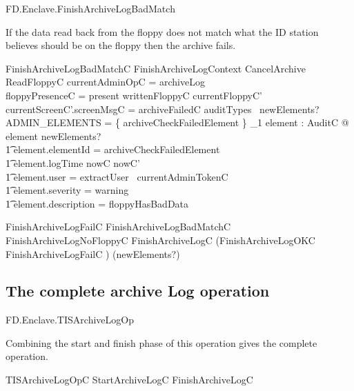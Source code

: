 \begin{traceunit}{FD.Enclave.FinishArchiveLogBadMatch}
\end{traceunit}

If the data read back from the floppy does not match what the ID
station believes should be on the floppy then the archive fails.

\begin{schema}{FinishArchiveLogBadMatchC}
        FinishArchiveLogContext
\also
        CancelArchive
\\      ReadFloppyC
\where
        \The currentAdminOpC = archiveLog
\\      floppyPresenceC = present
\also
        writtenFloppyC \neq currentFloppyC'
\also
        currentScreenC'.screenMsgC = archiveFailedC
\also
        auditTypes~ newElements? \cap ADMIN\_ELEMENTS = 
        \{ archiveCheckFailedElement \} 
\also
        \exists_1 element : AuditC @ element \in newElements? 
\\ \t1  \land element.elementId = archiveCheckFailedElement
\\ \t1  \land element.logTime \in nowC \upto nowC'
\\ \t1  \land element.user = extractUser~ currentAdminTokenC
\\ \t1  \land element.severity = warning
\\ \t1  \land element.description = floppyHasBadData
\end{schema}

\begin{zed}
        FinishArchiveLogFailC  FinishArchiveLogBadMatchC \lor
        FinishArchiveLogNoFloppyC
\also
        FinishArchiveLogC  (FinishArchiveLogOKC \lor FinishArchiveLogFailC
         ) \hide (newElements?)
\end{zed}

\subsection{The complete archive Log operation}

\begin{traceunit}{FD.Enclave.TISArchiveLogOp}
\end{traceunit}


Combining the start and finish phase of this operation gives the
complete operation.
\begin{zed}
        TISArchiveLogOpC  StartArchiveLogC \lor FinishArchiveLogC
\end{zed}


